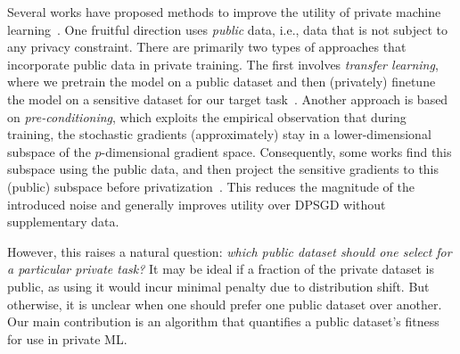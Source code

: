 \documentclass[11pt]{article}
\begin{document}
Several works have proposed methods to improve the utility of private machine learning~\cite{bypass,aws,cvpr,donot,KairouzRRT21}. One fruitful direction uses \emph{public} data, i.e., data that is not subject to any privacy constraint.
There are primarily two types of approaches that incorporate public data in private training.
The first involves \emph{transfer learning}, where we pretrain the model on a public dataset and then (privately) finetune the model on a sensitive dataset for our target task~\cite{cvpr, DP-SGD,YuNBGIKKLMWYZ22,LiTLH22}. Another approach is based on \emph{pre-conditioning}, which exploits the empirical observation that during training, the stochastic gradients (approximately) stay in a lower-dimensional subspace of the $p$-dimensional gradient space. Consequently, some works find this subspace using the public data, and then project the sensitive gradients to this (public) subspace before privatization~\cite{bypass,aws,donot,KairouzRRT21}.
This reduces the magnitude of the introduced noise and generally improves utility over DPSGD without supplementary data.

However, this raises a natural question: \textit{which public dataset should one select for a particular private task?} 
It may be ideal if a fraction of the private dataset is public, as using it would incur minimal penalty due to distribution shift.
But otherwise, it is unclear when one should prefer one public dataset over another.
Our main contribution is an algorithm that quantifies a public dataset's fitness for use in private ML. 
\end{document}
